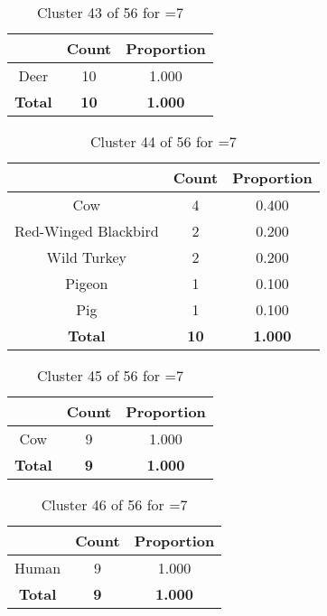 \begin{table}[ht!]
\centering
\begin{tabular}{|c|c|c|}
\hline
\bf \Spec{} &\bf Count &\bf Proportion\\ \hline \hline
Deer & 10 & 1.000\\ \hline
\hline
\bf Total & \bf 10 & \bf 1.000\\ \hline
\end{tabular}
\label{tab:cluster:43:7}
\caption{Cluster 43 of 56 for \minneigh{}=7}
\end{table}

\begin{table}[ht!]
\centering
\begin{tabular}{|c|c|c|}
\hline
\bf \Spec{} &\bf Count &\bf Proportion\\ \hline \hline
Cow & 4 & 0.400\\ \hline
Red-Winged Blackbird & 2 & 0.200\\ \hline
Wild Turkey & 2 & 0.200\\ \hline
Pigeon & 1 & 0.100\\ \hline
Pig & 1 & 0.100\\ \hline
\hline
\bf Total & \bf 10 & \bf 1.000\\ \hline
\end{tabular}
\label{tab:cluster:44:7}
\caption{Cluster 44 of 56 for \minneigh{}=7}
\end{table}

\begin{table}[ht!]
\centering
\begin{tabular}{|c|c|c|}
\hline
\bf \Spec{} &\bf Count &\bf Proportion\\ \hline \hline
Cow & 9 & 1.000\\ \hline
\hline
\bf Total & \bf 9 & \bf 1.000\\ \hline
\end{tabular}
\label{tab:cluster:45:7}
\caption{Cluster 45 of 56 for \minneigh{}=7}
\end{table}

\begin{table}[ht!]
\centering
\begin{tabular}{|c|c|c|}
\hline
\bf \Spec{} &\bf Count &\bf Proportion\\ \hline \hline
Human & 9 & 1.000\\ \hline
\hline
\bf Total & \bf 9 & \bf 1.000\\ \hline
\end{tabular}
\label{tab:cluster:46:7}
\caption{Cluster 46 of 56 for \minneigh{}=7}
\end{table}


